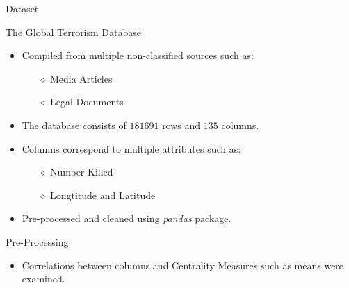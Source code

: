 \documentclass[10pt]{beamer}
\begin{document}



\begin{frame}{Dataset}
    \begin{block}{The Global Terrorism Database \cite{DataBase}}
        \begin{itemize}
            \item Compiled from multiple non-classified sources \cite{COOKBOOK} such as:
                \begin{itemize}
                    \item [$\diamond$] Media Articles
                    \item [$\diamond$] Legal Documents
                \end{itemize}
            \item The database consists of $181691$ rows and $135$ columns. 
            \item Columns correspond to multiple attributes such as: 
                \begin{itemize}
                    \item [$\diamond$] Number Killed 
                    \item [$\diamond$] Longtitude and Latitude 
                \end{itemize}
            \item Pre-processed and cleaned using \textit{pandas} package.    
        \end{itemize}
    \end{block}
    \begin{exampleblock}{Pre-Processing}
        \begin{itemize}
            \item Correlations between columns and Centrality Measures such as means were examined.
        \end{itemize}
    \end{exampleblock}
\end{frame}
\end{document}
